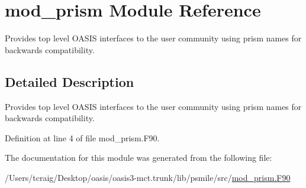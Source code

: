 \hypertarget{classmod__prism}{\section{mod\+\_\+prism Module Reference}
\label{classmod__prism}
}


Provides top level O\+A\+S\+I\+S interfaces to the user community using prism names for backwards compatibility.  




\subsection{Detailed Description}
Provides top level O\+A\+S\+I\+S interfaces to the user community using prism names for backwards compatibility. 

Definition at line 4 of file mod\+\_\+prism.\+F90.



The documentation for this module was generated from the following file\+:\begin{DoxyCompactItemize}
\item 
/\+Users/tcraig/\+Desktop/oasis/oasis3-\/mct.\+trunk/lib/psmile/src/\hyperlink{mod__prism_8_f90}{mod\+\_\+prism.\+F90}\end{DoxyCompactItemize}

